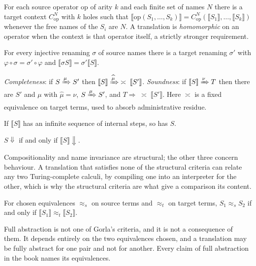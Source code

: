 \documentclass[11pt,openany]{book}
\theoremstyle{remark}
\begin{document}
\begin{description}[leftmargin=1.5em,style=nextline]
\item[Compositionality.] For each source operator $\mathrm{op}$ of arity
$k$ and each finite set of names $N$ there is a target context
$C^N_{\mathrm{op}}$ with $k$ holes such that
$\llbracket\mathrm{op}(S_1,\ldots,S_k)\rrbracket=
C^N_{\mathrm{op}}(\llbracket S_1\rrbracket,\ldots,\llbracket S_k\rrbracket)$
whenever the free names of the $S_i$ are $N$. A translation is
\emph{homomorphic} on an operator when the context is that operator
itself, a strictly stronger requirement.
\item[Name invariance.] For every injective renaming $\sigma$ of source
names there is a target renaming $\sigma'$ with
$\varphi\circ\sigma=\sigma'\circ\varphi$ and
$\llbracket\sigma S\rrbracket=\sigma'\llbracket S\rrbracket$.
\item[Operational correspondence.] \emph{Completeness}: if
$S\xRightarrow{\mu}S'$ then
$\llbracket S\rrbracket\xRightarrow{\widehat\mu}\;\asymp\;\llbracket S'\rrbracket$.
\emph{Soundness}: if $\llbracket S\rrbracket\xRightarrow{\nu}T$ then there
are $S'$ and $\mu$ with $\widehat\mu=\nu$, $S\xRightarrow{\mu}S'$, and
$T\Rightarrow\;\asymp\;\llbracket S'\rrbracket$. Here $\asymp$ is a fixed
equivalence on target terms, used to absorb administrative residue.
\item[Divergence reflection.] If $\llbracket S\rrbracket$ has an infinite
sequence of internal steps, so has $S$.
\item[Success sensitiveness.] $S\Downarrow$ if and only if
$\llbracket S\rrbracket\Downarrow$.
\end{description}

Compositionality and name invariance are structural; the other three
concern behaviour. A translation that satisfies none of the structural
criteria can relate any two Turing-complete calculi, by compiling one
into an interpreter for the other, which is why the structural criteria
are what give a comparison its content.

\begin{description}[leftmargin=1.5em,style=nextline]
\item[Full abstraction.] For chosen equivalences $\approx_s$ on source
terms and $\approx_t$ on target terms, $S_1\approx_s S_2$ if and only if
$\llbracket S_1\rrbracket\approx_t\llbracket S_2\rrbracket$.
\end{description}

Full abstraction is not one of Gorla's criteria, and it is not a
consequence of them. It depends entirely on the two equivalences chosen,
and a translation may be fully abstract for one pair and not for another.
Every claim of full abstraction in the book names its equivalences.
\end{document}
